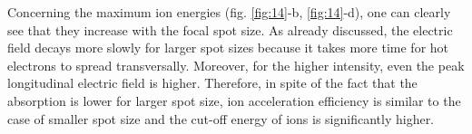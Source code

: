 Concerning the maximum ion energies (fig. \ref{fig:14}-b, \ref{fig:14}-d), one can clearly see that they increase with the focal spot size. As already discussed, the electric field decays more slowly for larger spot sizes because it takes more time for hot electrons to spread transversally. Moreover, for the higher intensity, even the peak longitudinal electric field is higher. Therefore, in spite of the fact that the absorption is lower for larger spot size, ion acceleration efficiency is similar to the case of smaller spot size and the cut-off energy of ions is significantly higher.